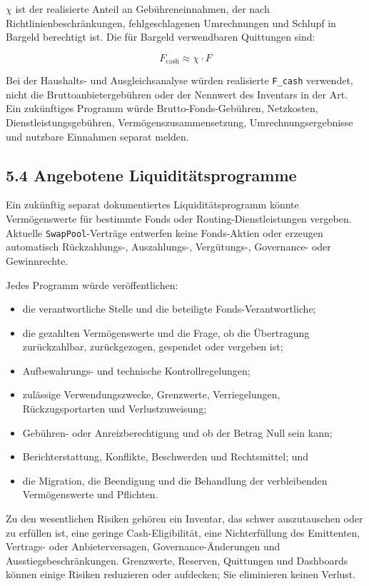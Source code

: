 \documentclass[11pt]{article}
\begin{document}
\texttt{$\chi$} ist der realisierte Anteil an Gebühreneinnahmen, der nach Richtlinienbeschränkungen, fehlgeschlagenen Umrechnungen und Schlupf in Bargeld berechtigt ist. Die für Bargeld verwendbaren Quittungen sind:

\[
F_{\mathrm{cash}} \approx \chi \cdot F
\]

Bei der Haushalts- und Ausgleichsanalyse würden realisierte \texttt{F\_cash} verwendet, nicht die Bruttoanbietergebühren oder der Nennwert des Inventars in der Art. Ein zukünftiges Programm würde Brutto-Fonds-Gebühren, Netzkosten, Dienstleistungsgebühren, Vermögenszusammensetzung, Umrechnungsergebnisse und nutzbare Einnahmen separat melden.

\subsection*{5.4 Angebotene Liquiditätsprogramme}

Ein zukünftig separat dokumentiertes Liquiditätsprogramm könnte Vermögenswerte für bestimmte Fonds oder Routing-Dienstleistungen vergeben. Aktuelle \texttt{SwapPool}-Verträge entwerfen keine Fonds-Aktien oder erzeugen automatisch Rückzahlungs-, Auszahlungs-, Vergütungs-, Governance- oder Gewinnrechte.

Jedes Programm würde veröffentlichen:

\begin{itemize}[leftmargin=*]
\item die verantwortliche Stelle und die beteiligte Fonds-Verantwortliche;
\item die gezahlten Vermögenswerte und die Frage, ob die Übertragung zurückzahlbar, zurückgezogen, gespendet oder vergeben ist;
\item Aufbewahrungs- und technische Kontrollregelungen;
\item zulässige Verwendungszwecke, Grenzwerte, Verriegelungen, Rückzugsportarten und Verlustzuweisung;
\item Gebühren- oder Anreizberechtigung und ob der Betrag Null sein kann;
\item Berichterstattung, Konflikte, Beschwerden und Rechtsmittel; und
\item die Migration, die Beendigung und die Behandlung der verbleibenden Vermögenswerte und Pflichten.
\end{itemize}
Zu den wesentlichen Risiken gehören ein Inventar, das schwer auszutauschen oder zu erfüllen ist, eine geringe Cash-Eligibilität, eine Nichterfüllung des Emittenten, Vertrags- oder Anbieterversagen, Governance-Änderungen und Ausstiegsbeschränkungen. Grenzwerte, Reserven, Quittungen und Dashboards können einige Risiken reduzieren oder aufdecken; Sie eliminieren keinen Verlust.
\end{document}

